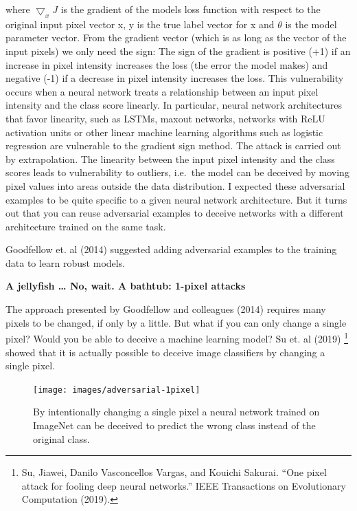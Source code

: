 \documentclass[
  12pt,
]{krantz}
\begin{document}
where \(\bigtriangledown_x{}J\) is the gradient of the models loss function with respect to the original input pixel vector x, y is the true label vector for x and \(\theta\) is the model parameter vector.
From the gradient vector (which is as long as the vector of the input pixels) we only need the sign:
The sign of the gradient is positive (+1) if an increase in pixel intensity increases the loss (the error the model makes) and negative (-1) if a decrease in pixel intensity increases the loss.
This vulnerability occurs when a neural network treats a relationship between an input pixel intensity and the class score linearly.
In particular, neural network architectures that favor linearity, such as LSTMs, maxout networks, networks with ReLU activation units or other linear machine learning algorithms such as logistic regression are vulnerable to the gradient sign method.
The attack is carried out by extrapolation.
The linearity between the input pixel intensity and the class scores leads to vulnerability to outliers, i.e.~the model can be deceived by moving pixel values into areas outside the data distribution.
I expected these adversarial examples to be quite specific to a given neural network architecture.
But it turns out that you can reuse adversarial examples to deceive networks with a different architecture trained on the same task.

Goodfellow et. al (2014) suggested adding adversarial examples to the training data to learn robust models.

\textbf{A jellyfish \ldots{} No, wait. A bathtub: 1-pixel attacks}

The approach presented by Goodfellow and colleagues (2014) requires many pixels to be changed, if only by a little.
But what if you can only change a single pixel?
Would you be able to deceive a machine learning model?
Su et. al (2019) \footnote{Su, Jiawei, Danilo Vasconcellos Vargas, and Kouichi Sakurai. ``One pixel attack for fooling deep neural networks.'' IEEE Transactions on Evolutionary Computation (2019).} showed that it is actually possible to deceive image classifiers by changing a single pixel.

\begin{figure}

{\centering \texttt{[image: images/adversarial-1pixel]} 

}

\caption{By intentionally changing a single pixel a neural network trained on ImageNet can be deceived to predict the wrong class instead of the original class.}\label{fig:adversarial-1pixel}
\end{figure}
\end{document}
